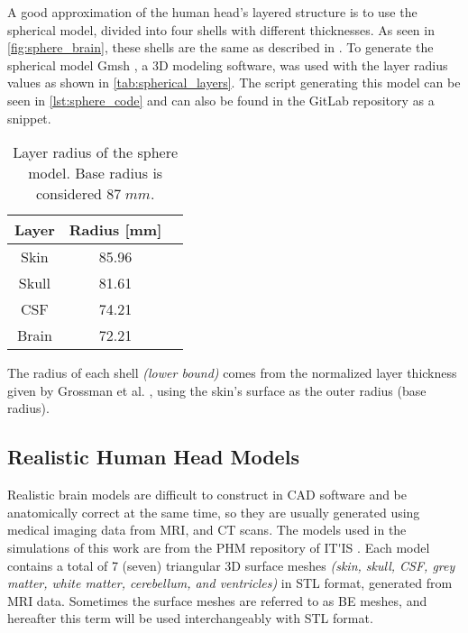 A good approximation of the human head's layered structure is to use the spherical model, divided into four shells with different thicknesses. As seen in \autoref{fig:sphere_brain}, these shells are the same as described in . To generate the spherical model Gmsh \cite{gmsh}, a 3D modeling software, was used with the layer radius values as shown in \autoref{tab:spherical_layers}. The script generating this model can be seen in \autoref{lst:sphere_code} and can also be found in the GitLab repository \cite{thesis_repo} as a snippet.
\begin{table}[!ht]
\begin{minipage}{.62\linewidth}
\centering
\caption{Layer radius of the sphere model. Base radius is considered $87\;\si{mm}$.}
\label{tab:spherical_layers}
\begin{tabular}{|c|c|c|}
\hline
\rowcolor[HTML]{C0C0C0} 
{\color[HTML]{000000} \textbf{Layer}} & {\color[HTML]{000000} \textbf{Radius {[}mm{]}}} \\ \hline
Skin & 85.96 \\ \hline
Skull & 81.61 \\ \hline
CSF & 74.21 \\ \hline
Brain & 72.21 \\ \hline
\end{tabular}
\end{minipage}
\end{table}

\noindent The radius of each shell \textit{(lower bound)} comes from the normalized layer thickness given by Grossman et al. \cite[Figure S2, J, and K]{Grossman2017}, using the skin's surface as the outer radius (base radius).

\pagebreak
\subsection{Realistic Human Head Models}
\label{sec:phm_models}

Realistic brain models are difficult to construct in \gls{CAD} software and be anatomically correct at the same time, so they are usually generated using medical imaging data from \gls{MRI}, and \gls{CT} scans. The models used in the simulations of this work are from the \gls{PHM} repository of \gls{IT'IS} \cite{ErikG.Lee2016,Lee2018,Lee2016}. Each model contains a total of 7 (seven) triangular 3D surface meshes \textit{(skin, skull, \gls{CSF}, grey matter, white matter, cerebellum, and ventricles)} in \gls{STL} format, generated from \gls{MRI} data. Sometimes the surface meshes are referred to as \gls{BE} meshes, and hereafter this term will be used interchangeably with \gls{STL} format.

